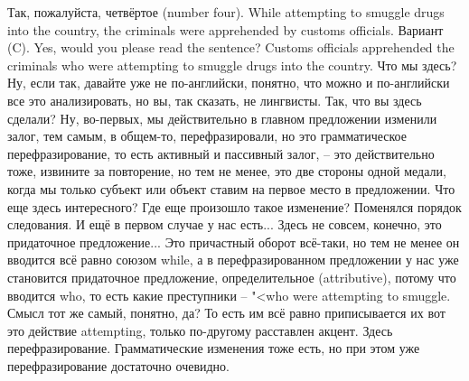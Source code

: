 \documentclass[main.tex]{subfiles}
\begin{document}
Так, пожалуйста, четвёртое (number four).
While attempting to smuggle drugs into the country, the criminals were apprehended by customs officials.
Вариант (C).
Yes, would you please read the sentence?
Customs officials apprehended the criminals who were attempting to smuggle drugs into the country.
Что мы здесь? Ну, если так, давайте уже не по-английски, понятно, что можно и по-английски все это анализировать, но вы, так сказать, не лингвисты.
Так, что вы здесь сделали?
Ну, во-первых, мы действительно в главном предложении изменили залог, тем самым, в общем-то, перефразировали, но это грамматическое перефразирование, то есть активный и пассивный залог, -- это действительно тоже, извините за повторение, но тем не менее, это две стороны одной медали, когда мы только субъект или объект ставим на первое место в предложении.
Что еще здесь интересного?
Где еще произошло такое изменение?
Поменялся порядок следования.
И ещё в первом случае у нас есть...
Здесь не совсем, конечно, это придаточное предложение...
Это причастный оборот всё-таки, но тем не менее он вводится всё равно союзом while, а в перефразированном предложении у нас уже становится придаточное предложение, определительное (attributive), потому что вводится who, то есть какие преступники -- "<who were attempting to smuggle.
Смысл тот же самый, понятно, да?
То есть им всё равно приписывается их вот это действие attempting, только по-другому расставлен акцент.
Здесь перефразирование.
Грамматические изменения тоже есть, но при этом уже перефразирование достаточно очевидно.
\end{document}
